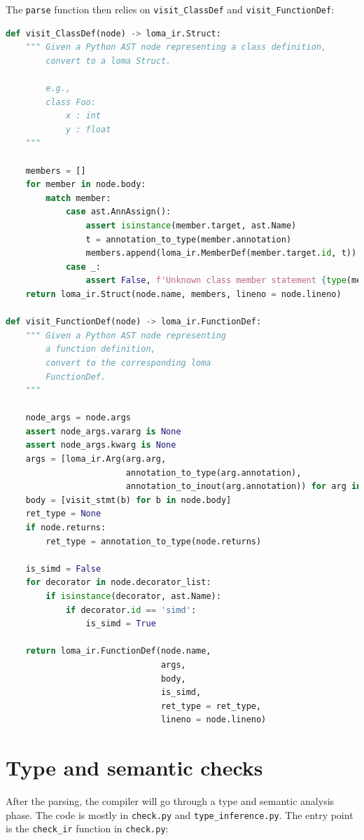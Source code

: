 The \lstinline{parse} function then relies on \lstinline{visit_ClassDef} and \lstinline{visit_FunctionDef}:
\begin{lstlisting}[language=Python]
def visit_ClassDef(node) -> loma_ir.Struct:
    """ Given a Python AST node representing a class definition,
        convert to a loma Struct.

        e.g.,
        class Foo:
            x : int
            y : float
    """

    members = []
    for member in node.body:
        match member:
            case ast.AnnAssign():
                assert isinstance(member.target, ast.Name)
                t = annotation_to_type(member.annotation)
                members.append(loma_ir.MemberDef(member.target.id, t))
            case _:
                assert False, f'Unknown class member statement {type(member).__name__}'
    return loma_ir.Struct(node.name, members, lineno = node.lineno)

def visit_FunctionDef(node) -> loma_ir.FunctionDef:
    """ Given a Python AST node representing
        a function definition,
        convert to the corresponding loma
        FunctionDef.
    """

    node_args = node.args
    assert node_args.vararg is None
    assert node_args.kwarg is None
    args = [loma_ir.Arg(arg.arg,
                        annotation_to_type(arg.annotation),
                        annotation_to_inout(arg.annotation)) for arg in node_args.args]
    body = [visit_stmt(b) for b in node.body]
    ret_type = None
    if node.returns:
        ret_type = annotation_to_type(node.returns)

    is_simd = False
    for decorator in node.decorator_list:
        if isinstance(decorator, ast.Name):
            if decorator.id == 'simd':
                is_simd = True

    return loma_ir.FunctionDef(node.name,
                               args,
                               body,
                               is_simd,
                               ret_type = ret_type,
                               lineno = node.lineno)
\end{lstlisting}

\section{Type and semantic checks}
After the parsing, the compiler will go through a type and semantic analysis phase. The code is mostly in \lstinline{check.py} and \lstinline{type_inference.py}. The entry point is the \lstinline{check_ir} function in \lstinline{check.py}:

